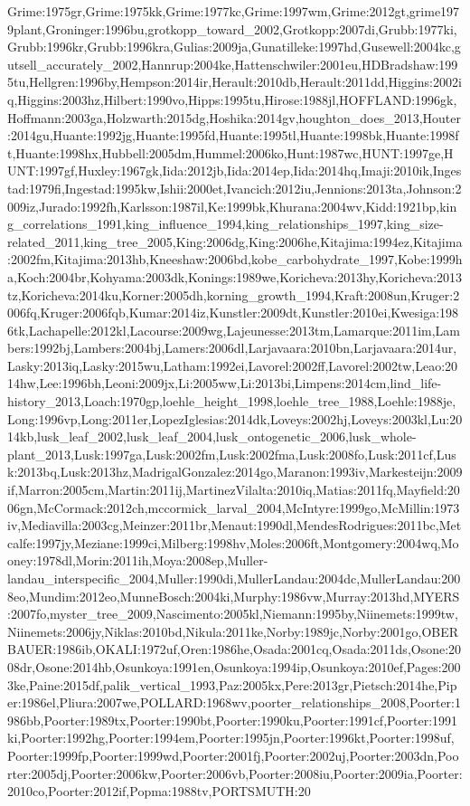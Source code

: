\documentclass[10pt,twoside]{article}\usepackage[]{graphicx}\usepackage[]{color}
\begin{document}
Grime:1975gr,Grime:1975kk,Grime:1977kc,Grime:1997wm,Grime:2012gt,grime1979plant,Groninger:1996bu,grotkopp_toward_2002,Grotkopp:2007di,Grubb:1977ki,Grubb:1996kr,Grubb:1996kra,Gulias:2009ja,Gunatilleke:1997hd,Gusewell:2004kc,gutsell_accurately_2002,Hannrup:2004ke,Hattenschwiler:2001eu,HDBradshaw:1995tu,Hellgren:1996by,Hempson:2014ir,Herault:2010db,Herault:2011dd,Higgins:2002iq,Higgins:2003hz,Hilbert:1990vo,Hipps:1995tu,Hirose:1988jl,HOFFLAND:1996gk,Hoffmann:2003ga,Holzwarth:2015dg,Hoshika:2014gv,houghton_does_2013,Houter:2014gu,Huante:1992jg,Huante:1995fd,Huante:1995tl,Huante:1998bk,Huante:1998ft,Huante:1998hx,Hubbell:2005dm,Hummel:2006ko,Hunt:1987wc,HUNT:1997ge,HUNT:1997gf,Huxley:1967gk,Iida:2012jb,Iida:2014ep,Iida:2014hq,Imaji:2010ik,Ingestad:1979fi,Ingestad:1995kw,Ishii:2000et,Ivancich:2012iu,Jennions:2013ta,Johnson:2009iz,Jurado:1992fh,Karlsson:1987il,Ke:1999bk,Khurana:2004wv,Kidd:1921bp,king_correlations_1991,king_influence_1994,king_relationships_1997,king_size-related_2011,king_tree_2005,King:2006dg,King:2006he,Kitajima:1994ez,Kitajima:2002fm,Kitajima:2013hb,Kneeshaw:2006bd,kobe_carbohydrate_1997,Kobe:1999ha,Koch:2004br,Kohyama:2003dk,Konings:1989we,Koricheva:2013hy,Koricheva:2013tz,Koricheva:2014ku,Korner:2005dh,korning_growth_1994,Kraft:2008un,Kruger:2006fq,Kruger:2006fqb,Kumar:2014iz,Kunstler:2009dt,Kunstler:2010ei,Kwesiga:1986tk,Lachapelle:2012kl,Lacourse:2009wg,Lajeunesse:2013tm,Lamarque:2011im,Lambers:1992bj,Lambers:2004bj,Lamers:2006dl,Larjavaara:2010bn,Larjavaara:2014ur,Lasky:2013iq,Lasky:2015wu,Latham:1992ei,Lavorel:2002ff,Lavorel:2002tw,Leao:2014hw,Lee:1996bh,Leoni:2009jx,Li:2005ww,Li:2013bi,Limpens:2014cm,lind_life-history_2013,Loach:1970gp,loehle_height_1998,loehle_tree_1988,Loehle:1988je,Long:1996vp,Long:2011er,LopezIglesias:2014dk,Loveys:2002hj,Loveys:2003kl,Lu:2014kb,lusk_leaf_2002,lusk_leaf_2004,lusk_ontogenetic_2006,lusk_whole-plant_2013,Lusk:1997ga,Lusk:2002fm,Lusk:2002fma,Lusk:2008fo,Lusk:2011cf,Lusk:2013bq,Lusk:2013hz,MadrigalGonzalez:2014go,Maranon:1993iv,Markesteijn:2009if,Marron:2005cm,Martin:2011ij,MartinezVilalta:2010iq,Matias:2011fq,Mayfield:2006gn,McCormack:2012ch,mccormick_larval_2004,McIntyre:1999go,McMillin:1973iv,Mediavilla:2003cg,Meinzer:2011br,Menaut:1990dl,MendesRodrigues:2011bc,Metcalfe:1997jy,Meziane:1999ci,Milberg:1998hv,Moles:2006ft,Montgomery:2004wq,Mooney:1978dl,Morin:2011ih,Moya:2008ep,Muller-landau_interspecific_2004,Muller:1990di,MullerLandau:2004dc,MullerLandau:2008eo,Mundim:2012eo,MunneBosch:2004ki,Murphy:1986vw,Murray:2013hd,MYERS:2007fo,myster_tree_2009,Nascimento:2005kl,Niemann:1995by,Niinemets:1999tw,Niinemets:2006jy,Niklas:2010bd,Nikula:2011ke,Norby:1989jc,Norby:2001go,OBERBAUER:1986ib,OKALI:1972uf,Oren:1986he,Osada:2001cq,Osada:2011ds,Osone:2008dr,Osone:2014hb,Osunkoya:1991en,Osunkoya:1994ip,Osunkoya:2010ef,Pages:2003ke,Paine:2015df,palik_vertical_1993,Paz:2005kx,Pere:2013gr,Pietsch:2014he,Piper:1986el,Pliura:2007we,POLLARD:1968wv,poorter_relationships_2008,Poorter:1986bb,Poorter:1989tx,Poorter:1990bt,Poorter:1990ku,Poorter:1991cf,Poorter:1991ki,Poorter:1992hg,Poorter:1994em,Poorter:1995jn,Poorter:1996kt,Poorter:1998uf,Poorter:1999fp,Poorter:1999wd,Poorter:2001fj,Poorter:2002uj,Poorter:2003dn,Poorter:2005dj,Poorter:2006kw,Poorter:2006vb,Poorter:2008iu,Poorter:2009ia,Poorter:2010co,Poorter:2012if,Popma:1988tv,PORTSMUTH:20
\end{document}
